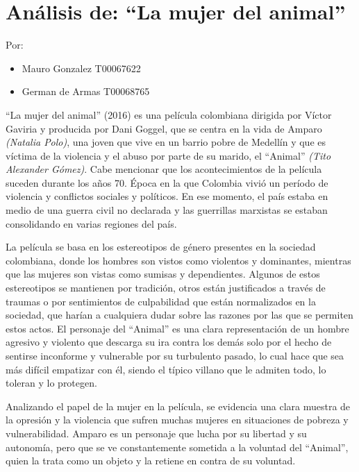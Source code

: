 \documentclass[letterpaper, 12pt]{report}
\begin{document}
\chapter*{Análisis de: ``La mujer del animal''}

\noindent\makebox[\linewidth]{\rule{\textwidth}{0.4pt}}

Por:
\begin{itemize}[label=$\triangleright$]
    \item Mauro Gonzalez T00067622
    \item German de Armas T00068765
\end{itemize}

\noindent\makebox[\linewidth]{\rule{\textwidth}{0.4pt}}

\nocite{Pelicula}

``La mujer del animal'' (2016) es una película colombiana dirigida por Víctor Gaviria y
producida por Dani Goggel, que se centra en la vida de Amparo
\textit{(Natalia Polo)}, una joven que vive en un barrio pobre de Medellín
y que es víctima de la violencia y el abuso por parte de su marido, el
``Animal'' \textit{(Tito Alexander Gómez)}. Cabe mencionar que los
acontecimientos de la película suceden durante los años 70. Época en la que
Colombia vivió un período de violencia y conflictos sociales y políticos.
En ese momento, el país estaba en medio de una guerra civil no declarada y
las guerrillas marxistas se estaban consolidando en varias regiones del país.

La película se basa en los estereotipos de género presentes
en la sociedad colombiana, donde los hombres son vistos
como violentos y dominantes, mientras que las mujeres son
vistas como sumisas y dependientes. Algunos de estos
estereotipos se mantienen por tradición, otros están
justificados a través de traumas o por sentimientos de
culpabilidad que están normalizados en la sociedad, que
harían a cualquiera dudar sobre las razones por las que se
permiten estos actos. El personaje del ``Animal'' es una
clara representación de un hombre agresivo y violento que
descarga su ira contra los demás solo por el hecho de
sentirse inconforme y vulnerable por su turbulento pasado,
lo cual hace que sea más difícil empatizar con él, siendo
el típico villano que le admiten todo, lo toleran y lo
protegen.

Analizando el papel de la mujer en la película, se
evidencia una clara muestra de la opresión y la violencia
que sufren muchas mujeres en situaciones de pobreza y
vulnerabilidad. Amparo es un personaje que lucha por su
libertad y su autonomía, pero que se ve constantemente
sometida a la voluntad del ``Animal'', quien la trata como
un objeto y la retiene en contra de su voluntad.
\end{document}
